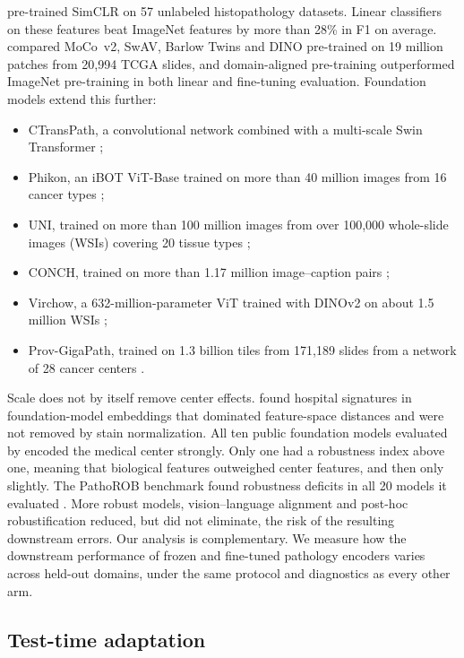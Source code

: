 \citet{ciga2022ssl} pre-trained SimCLR on 57 unlabeled histopathology datasets.
Linear classifiers on these features beat ImageNet features by more than 28\%
in F1 on average. \citet{kang2023benchmarking} compared MoCo~v2,
SwAV, Barlow Twins and DINO pre-trained on 19 million patches from 20,994 TCGA
slides, and domain-aligned pre-training outperformed ImageNet pre-training in
both linear and fine-tuning evaluation. Foundation models extend this further:
\begin{itemize}
  \item CTransPath, a convolutional network combined with a multi-scale Swin
    Transformer \citep{wang2022ctranspath};
  \item Phikon, an iBOT ViT-Base trained on more than 40 million images from 16
    cancer types \citep{filiot2023phikon};
  \item UNI, trained on more than 100 million images from over 100,000
    whole-slide images (WSIs) covering 20 tissue types \citep{chen2024uni};
  \item CONCH, trained on more than 1.17 million image--caption pairs
    \citep{lu2024conch};
  \item Virchow, a 632-million-parameter ViT trained with DINOv2 on about
    1.5 million WSIs \citep{vorontsov2024virchow};
  \item Prov-GigaPath, trained on 1.3 billion tiles from 171,189 slides from a
    network of 28 cancer centers \citep{xu2024gigapath}.
\end{itemize}

Scale does not by itself remove center effects. \citet{komen2024batch} found
hospital signatures in foundation-model embeddings that dominated feature-space
distances and were not removed by stain normalization. All ten public
foundation models evaluated by \citet{dejong2025unrobust} encoded the medical
center strongly. Only one had a robustness index above one, meaning that
biological features outweighed center features, and then only slightly.
The PathoROB benchmark found robustness deficits in all 20 models it evaluated
\citep{komen2026robust}. More robust models, vision--language alignment and
post-hoc robustification reduced, but did not eliminate, the risk of the
resulting downstream errors. Our analysis is complementary. We measure how the
downstream performance of frozen and fine-tuned pathology encoders
\citep{kang2023benchmarking} varies across held-out domains, under the same
protocol and diagnostics as every other arm.

\subsection{Test-time adaptation}
\label{sec:related-tta}

